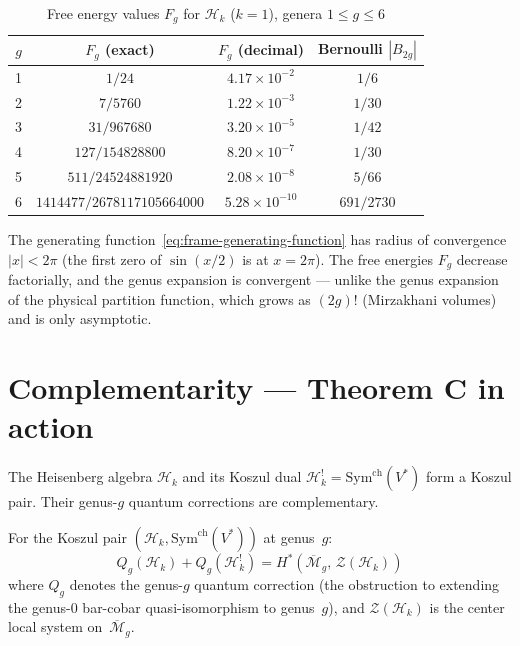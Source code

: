 \begin{table}[ht]
\centering
\caption{Free energy values $F_g$ for $\mathcal{H}_k$ ($k = 1$),
genera $1 \leq g \leq 6$}
\label{tab:frame-free-energy}
\begin{tabular}{|c|c|c|c|}
\hline
$g$ & $F_g$ (exact) & $F_g$ (decimal) &
  Bernoulli $|B_{2g}|$ \\
\hline
1 & $1/24$ & $4.17 \times 10^{-2}$ & $1/6$ \\
2 & $7/5760$ & $1.22 \times 10^{-3}$ & $1/30$ \\
3 & $31/967680$ & $3.20 \times 10^{-5}$ & $1/42$ \\
4 & $127/154828800$ & $8.20 \times 10^{-7}$ & $1/30$ \\
5 & $511/24524881920$ & $2.08 \times 10^{-8}$ & $5/66$ \\
6 & $1414477/2678117105664000$ & $5.28 \times 10^{-10}$ &
$691/2730$ \\
\hline
\end{tabular}
\end{table}

The generating function~\eqref{eq:frame-generating-function} has
radius of convergence $|x| < 2\pi$ (the first zero of $\sin(x/2)$
is at $x = 2\pi$).  The free energies $F_g$ decrease factorially,
and the genus expansion is convergent --- unlike the
genus expansion of the physical partition function, which grows as
$(2g)!$ (Mirzakhani volumes) and is only asymptotic.

\section{Complementarity --- Theorem C in action}
\label{sec:frame-complementarity}

The Heisenberg algebra $\mathcal{H}_k$ and its Koszul dual
$\mathcal{H}_k^! = \mathrm{Sym}^{\mathrm{ch}}(V^*)$ form
a Koszul pair.  Their genus-$g$ quantum corrections are
complementary.

\begin{theorem}
\label{thm:frame-complementarity}
For the Koszul pair
$(\mathcal{H}_k, \mathrm{Sym}^{\mathrm{ch}}(V^*))$
at genus~$g$:
\begin{equation}\label{eq:frame-complementarity}
Q_g(\mathcal{H}_k) + Q_g(\mathcal{H}_k^!)
= H^*(\overline{\mathcal{M}}_g,\, \mathcal{Z}(\mathcal{H}_k))
\end{equation}
where $Q_g$ denotes the genus-$g$ quantum correction (the
obstruction to extending the genus-$0$ bar-cobar
quasi-isomorphism to genus~$g$), and $\mathcal{Z}(\mathcal{H}_k)$
is the center local system on~$\overline{\mathcal{M}}_g$.
\end{theorem}

